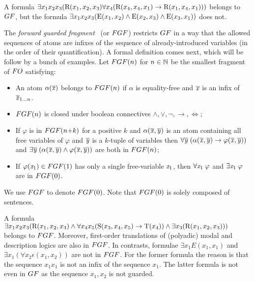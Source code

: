 \begin{example}
A formula $\exists{x_{1}x_{2}x_{3}} (\relR(x_{1}, x_{2}, x_{3}) \and \forall x_{4}(\relR(x_{4}, x_{4}, x_{1}) \to \relR(x_{1}, x_{4}, x_{1})))$ belongs to $\GF$, but the formula $\exists{x_{1}x_{2}x_{3}} (\mathrm{E}(x_{1}, x_{2}) \land \mathrm{E}(x_{2}, x_{3}) \land \mathrm{E}(x_{3}, x_{1}))$ does not.
\end{example}

The \emph{forward guarded fragment}~\cite[Sec. 3.1]{Bednarczyk21} (or $\FGF$) restricts $\GF$ in a way that the allowed sequences of atoms are infixes of the sequence of already-introduced variables (in the order of their quantification).
A formal definition comes next, which will be follow by a bunch of examples.
Let $\FGF(n)$ for $n \in {\mathbb{N}}$ be the smallest fragment of $\FO$ satisfying:
\begin{itemize}\itemsep0em
    \item An atom $\alpha(\overline{\mathit{x}})$ belongs to $\FGF(n)$ if $\alpha$ is equality-free and $\overline{\mathit{x}}$ is an infix of $\overline{\mathit{x}}_{1\ldots n}$.
    \item $\FGF(n)$ is closed under boolean connectives $\land, \lor, \neg, \to, \iff$;
    \item If $\varphi$ is in $\FGF(n{+}k)$ for a positive $k$ and $\alpha(\overline{\mathit{x}}, \overline{\mathit{y}})$ is an atom containing all free variables of $\varphi$ and $\overline{\mathit{y}}$ is a $k$-tuple of variables then  $\forall{\overline{\mathit{y}}} \; (\alpha(\overline{\mathit{x}}, \overline{\mathit{y}}) \to \varphi(\overline{\mathit{x}}, \overline{\mathit{y}}))$ and $\exists{\overline{\mathit{y}}} \; (\alpha(\overline{\mathit{x}}, \overline{\mathit{y}}) \land \varphi(\overline{\mathit{x}}, \overline{\mathit{y}}))$ are both in $\FGF(n)$; 
    \item If $\varphi(\varx_1) \in \FGF(1)$ has only a single free-variable $\mathit{x}_1$, then $\forall{\mathit{x}_1}\; \varphi$ and $\exists{\mathit{x}_1}\; \varphi$ are in $\FGF(0)$.
\end{itemize}
We use $\FGF$ to denote $\FGF(0)$. Note that $\FGF(0)$ is solely composed of sentences. 

\begin{example}
A formula $\exists{x_1x_{2}x_{3}}(\mathrm{R}(x_{1}, x_{2}, x_{3}) \land \forall{x_{4}x_{5}}(\mathrm{S}(x_{3}, x_{4}, x_{5}) \to \mathrm{T}(x_{4})) \land \exists{x_{3}}(\mathrm{R}(x_{1}, x_{2}, x_{3})))$ belongs to $\FGF$.
Moreover, first-order translations of (polyadic) modal and description logics are also in $\FGF$.
In contrasts, formulae $\exists{x_{1}} E(x_{1}, x_{1})$ and $\exists{x_{1}} (\forall{x_{2}} \epsilon(x_{1}, x_{2}))$ are not in $\FGF$. 
For the former formula the reason is that the sequence $x_1x_1$ is not an infix of the sequence $x_1$.
The latter formula is not even in $\GF$ as the sequence $x_{1}, x_{2}$ is not guarded.
\end{example}

